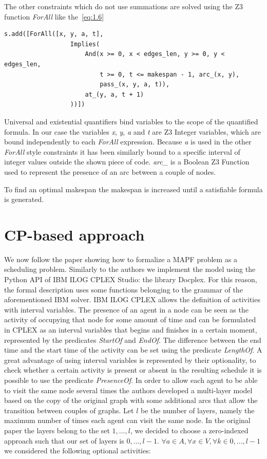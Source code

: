 \documentclass[12pt, a4paper, hidelinks]{article}
\numberwithin{equation}{section}
\begin{document}
The other constraints which do not use summations are solved using the Z3 function \textit{ForAll} like the~\ref{eq:1.6}

\begin{lstlisting}[label={lst:1.6}]
s.add([ForAll([x, y, a, t],
                  Implies(
                      And(x >= 0, x < edges_len, y >= 0, y < edges_len,
                          t >= 0, t <= makespan - 1, arc_(x, y),
                          pass_(x, y, a, t)),
                      at_(y, a, t + 1)
                  ))])
\end{lstlisting}

Universal and existential quantifiers bind variables to the scope of the quantified formula.
In our case the variables \textit{x}, \textit{y}, \textit{a} and \textit{t} are Z3 Integer variables, which are bound independently to each \textit{ForAll} expression.
Because \textit{a} is used in the other \textit{ForAll} style constraints it has been similarly bound to a specific interval of integer values outside the shown piece of code.
\textit{arc\_} is a Boolean Z3 Function used to represent the presence of an arc between a couple of nodes.

To find an optimal makespan the makespan is increased until a satisfiable formula is generated.

\section{CP-based approach}\label{sec:cp-based-approach}

We now follow the paper showing how to formalize a MAPF problem as a scheduling problem.
Similarly to the authors we implement the model using the Python API of IBM ILOG CPLEX Studio: the library Docplex.
For this reason, the formal description uses some functions belonging to the grammar of the aforementioned IBM solver.
IBM ILOG CPLEX allows the definition of activities with interval variables.
The presence of an agent in a node can be seen as the activity of occupying that node for some amount of time and can be formulated in CPLEX as an interval variables that begins and finishes in a certain moment, represented by the predicates \textit{StartOf} and \textit{EndOf}.
The difference between the end time and the start time of the activity can be set using the predicate \textit{LengthOf}.
A great advantage of using interval variables is represented by their optionality, to check whether a certain activity is present or absent in the resulting schedule it is possible to use the predicate \textit{PresenceOf}.
In order to allow each agent to be able to visit the same node several times the authors developed a multi-layer model based on the copy of the original graph with some additional arcs that allow the transition between couples of graphs.
Let $l$ be the number of layers, namely the maximum number of times each agent can visit the same node.
In the original paper the layers belong to the set ${1,\dots,l}$, we decided to choose a zero-indexed approach such that our set of layers is ${0,\dots,l-1}$.
$\forall a \in A, \forall x \in V, \forall k \in {0,...,l-1}$ we considered the following optional activities:
\end{document}
